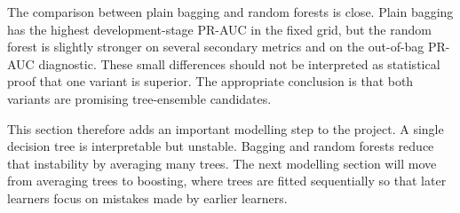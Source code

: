 The comparison between plain bagging and random forests is close. Plain bagging has the highest development-stage PR-AUC in the fixed grid, but the random forest is slightly stronger on several secondary metrics and on the out-of-bag PR-AUC diagnostic. These small differences should not be interpreted as statistical proof that one variant is superior. The appropriate conclusion is that both variants are promising tree-ensemble candidates.

This section therefore adds an important modelling step to the project. A single decision tree is interpretable but unstable. Bagging and random forests reduce that instability by averaging many trees. The next modelling section will move from averaging trees to boosting, where trees are fitted sequentially so that later learners focus on mistakes made by earlier learners.
